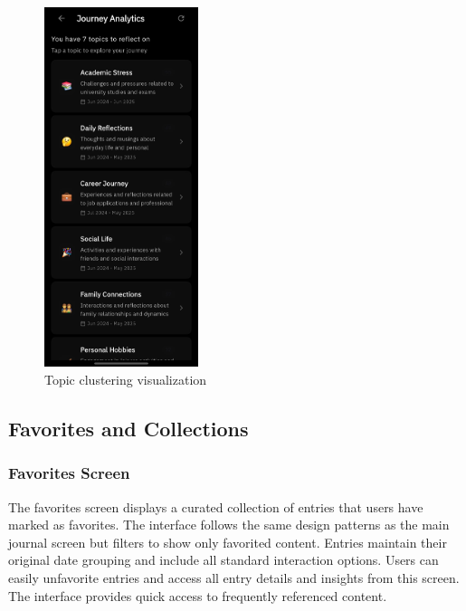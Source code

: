 \begin{figure}[H]
\centering
\includegraphics[width=0.4\textwidth]{files/imgs/prototype/topic_clustering.jpeg}
\caption{Topic clustering visualization}
\label{fig:topic-clustering}
\end{figure}

\subsection{Favorites and Collections}

\subsubsection{Favorites Screen}

The favorites screen displays a curated collection of entries that users have marked as favorites. The interface follows the same design patterns as the main journal screen but filters to show only favorited content. Entries maintain their original date grouping and include all standard interaction options. Users can easily unfavorite entries and access all entry details and insights from this screen. The interface provides quick access to frequently referenced content.

